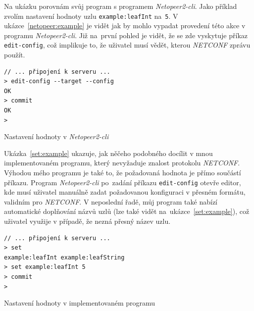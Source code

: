 \documentclass[thesis=B,czech,hidelinks]{FITthesis}[2019/03/06]
\begin{document}
Na ukázku porovnám svůj program s programem \textit{Netopeer2-cli}. Jako příklad zvolím nastavení hodnoty uzlu \texttt{example:leafInt} na~\texttt{5}. V ukázce~\ref{netopeer:example} je vidět jak by mohlo vypadat provedení této akce v programu \textit{Netopeer2-cli}. Již na~první pohled je vidět, že se zde vyskytuje příkaz \texttt{edit-config}, což implikuje to, že uživatel musí vědět, kterou \textit{NETCONF} zprávu použít.

\begin{listing}[H]
\begin{verbatim}
// ... připojení k serveru ...
> edit-config --target --config
OK
> commit
OK
>
\end{verbatim}
\caption{Nastavení hodnoty v \textit{Netopeer2-cli}\label{netopeer:example}}
\end{listing}

Ukázka~\ref{set:example} ukazuje, jak něčeho podobného docílit v mnou implementovaném programu, který nevyžaduje znalost protokolu \textit{NETCONF}. Výhodou mého programu je také to, že požadovaná hodnota je přímo součástí příkazu. Program \textit{Netopeer2-cli} po~zadání příkazu \texttt{edit-config} otevře editor, kde musí uživatel manuálně zadat požadovanou konfiguraci v přesném formátu, validním pro \textit{NETCONF}. V neposlední řadě, můj program také nabízí automatické doplňování názvů uzlů (lze také vidět na~ukázce~\ref{set:example}), což uživatel využije v případě, že nezná přesný název uzlu.
\begin{listing}[H]
\begin{verbatim}
// ... připojení k serveru ...
> set
example:leafInt example:leafString
> set example:leafInt 5
> commit
>
\end{verbatim}
\caption{Nastavení hodnoty v implementovaném programu}\label{set:example}
\end{listing}
\end{document}
